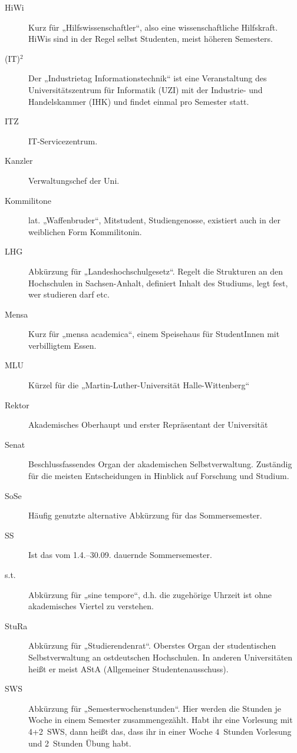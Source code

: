\begin{description}
\item[HiWi] Kurz für „Hilfswissenschaftler“, also eine wissenschaftliche Hilfskraft.
            HiWis sind in der Regel selbst Studenten, meist höheren Semesters.
\item[(IT)$^2$] Der „Industrietag Informationstechnik“ ist eine Veranstaltung des Universitätszentrum für Informatik (UZI)
                mit der Industrie- und Handelskammer (IHK) und findet einmal pro Semester statt.
\item[ITZ] IT-Servicezentrum.\\
\item[Kanzler] Verwaltungschef der Uni.
\item[Kommilitone] lat. „Waffenbruder“, Mitstudent, Studiengenosse, existiert auch in der weiblichen Form Kommilitonin.
\item[LHG] Abkürzung für „Landeshochschulgesetz“.
           Regelt die Strukturen an den Hochschulen in Sachsen-Anhalt, definiert Inhalt des Studiums, legt fest, wer studieren darf etc.
\item[Mensa] Kurz für „mensa academica“, einem Speisehaus für StudentInnen mit verbilligtem Essen.
\item[MLU] Kürzel für die „Martin-Luther-Universität Halle-Wittenberg“
\item[Rektor] Akademisches Oberhaupt und erster Repräsentant der Universität
\item[Senat] Beschlussfassendes Organ der akademischen Selbstverwaltung.
             Zuständig für die meisten Entscheidungen in Hinblick auf Forschung und Studium.
\item[SoSe] Häufig genutzte alternative Abkürzung für das Sommersemester.
\item[SS] Ist das vom 1.4.--30.09. dauernde Sommersemester.
\item[s.t.] Abkürzung für „sine tempore“, d.h. die zugehörige Uhrzeit ist ohne akademisches Viertel zu verstehen.
\item[StuRa] Abkürzung für „Studierendenrat“. Oberstes Organ der studentischen Selbstverwaltung an ostdeutschen Hochschulen.
             In anderen Universitäten heißt er meist AStA (Allgemeiner Studentenausschuss).\\
\item[SWS] Abkürzung für „Semesterwochenstunden“. Hier werden die Stunden je Woche in einem Semester zusammengezählt.
           Habt ihr eine Vorlesung mit 4+2~SWS, dann heißt das, dass ihr in einer Woche 4~Stunden Vorlesung und 2~Stunden Übung habt.

\end{description}

